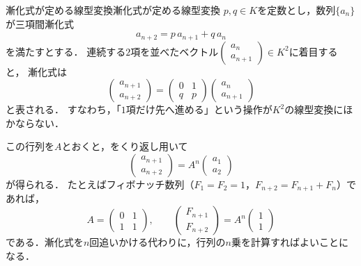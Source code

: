 \begin{example}{漸化式が定める線型変換}{漸化式が定める線型変換}
  $p, q \in K$を定数とし，数列$\{a_n\}$が三項間漸化式
  \[
    a_{n+2} = p\,a_{n+1} + q\,a_n
  \]
  を満たすとする．
  連続する$2$項を並べたベクトル$\begin{pmatrix} a_n \\ a_{n+1} \end{pmatrix} \in K^2$に着目すると，
  漸化式は
  \[
    \begin{pmatrix} a_{n+1} \\ a_{n+2} \end{pmatrix}
    = \begin{pmatrix} 0 & 1 \\ q & p \end{pmatrix}
      \begin{pmatrix} a_{n} \\ a_{n+1} \end{pmatrix}
  \]
  と表される．
  すなわち，「$1$項だけ先へ進める」という操作が$K^2$の線型変換にほかならない．

  この行列を$A$とおくと，をくり返し用いて
  \[
    \begin{pmatrix} a_{n+1} \\ a_{n+2} \end{pmatrix}
    = A^{n} \begin{pmatrix} a_{1} \\ a_{2} \end{pmatrix}
  \]
  が得られる．
  たとえばフィボナッチ数列（$F_1 = F_2 = 1$，$F_{n+2} = F_{n+1} + F_n$）であれば，
  \[
    A = \begin{pmatrix} 0 & 1 \\ 1 & 1 \end{pmatrix}, \qquad
    \begin{pmatrix} F_{n+1} \\ F_{n+2} \end{pmatrix}
    = A^{n} \begin{pmatrix} 1 \\ 1 \end{pmatrix}
  \]
  である．漸化式を$n$回追いかける代わりに，行列の$n$乗を計算すればよいことになる．
\end{example}

